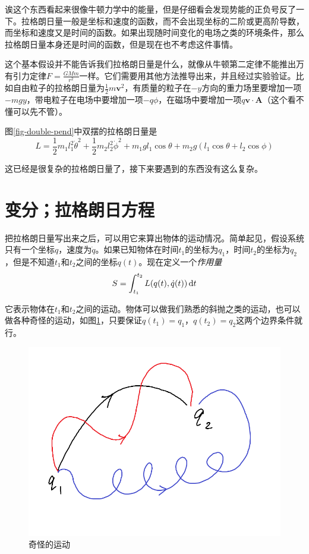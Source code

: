 诶这个东西看起来很像牛顿力学中的能量，但是仔细看会发现势能的正负号反了一下。拉格朗日量一般是坐标和速度的函数，而不会出现坐标的二阶或更高阶导数，而坐标和速度又是时间的函数。如果出现随时间变化的电场之类的环境条件，那么拉格朗日量本身还是时间的函数，但是现在也不考虑这件事情。

这个基本假设并不能告诉我们拉格朗日量是什么，就像从牛顿第二定律不能推出万有引力定律$F=\frac{G M m}{r^2}$一样。它们需要用其他方法推导出来，并且经过实验验证。比如自由粒子的拉格朗日量为$\frac{1}{2}m \mathbf{v}^2$，有质量的粒子在$-y$方向的重力场里要增加一项$-m g y$，带电粒子在电场中要增加一项$-q \phi$，在磁场中要增加一项$q \mathbf{v} \cdot \mathbf{A}$（这个看不懂可以先不管）。

图\ref{fig-double-pend}中双摆的拉格朗日量是
\begin{equation*}
L=\frac{1}{2}m_1 l_1^2 \dot \theta^2+\frac{1}{2}m_2 l_2^2 \dot \phi^2+m_1 g l_1 \cos \theta+m_2 g (l_1 \cos \theta+l_2 \cos \phi)
\end{equation*}

这已经是很复杂的拉格朗日量了，接下来要遇到的东西没有这么复杂。
\section{变分；拉格朗日方程}
把拉格朗日量写出来之后，可以用它来算出物体的运动情况。简单起见，假设系统只有一个坐标$q$，速度为$\dot q$。如果已知物体在时间$t_1$的坐标为$q_1$，时间$t_2$的坐标为$q_2$，但是不知道$t_1$和$t_2$之间的坐标$q(t)$。现在定义一个\emph{作用量}
\begin{equation*}
S=\int_{t_1}^{t_2} L(q(t),\dot q(t)) \mathop{}\!\mathrm{d} t
\end{equation*}

它表示物体在$t_1$和$t_2$之间的运动。物体可以做我们熟悉的斜抛之类的运动，也可以做各种奇怪的运动，如图\ref{fig-strange-move}，只要保证$q(t_1)=q_1$，$q(t_2)=q_2$这两个边界条件就行。
\begin{figure}[htb]
\centering
\includegraphics[scale=0.5]{fig/strange-move.png}
\caption{奇怪的运动}
\label{fig-strange-move}
\end{figure}

